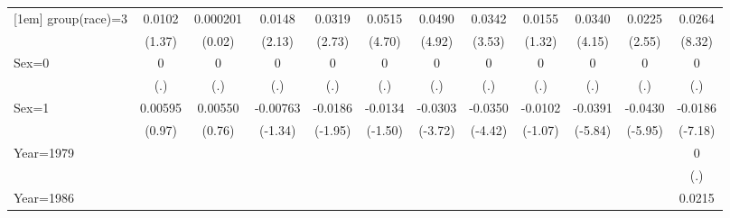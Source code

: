 \begin{table}[htbp]
\begin{tabular}{l*{11}{c}}
[1em]
group(race)=3       &      0.0102         &    0.000201         &      0.0148\sym{*}  &      0.0319\sym{**} &      0.0515\sym{***}&      0.0490\sym{***}&      0.0342\sym{***}&      0.0155         &      0.0340\sym{***}&      0.0225\sym{*}  &      0.0264\sym{***}\\
                    &      (1.37)         &      (0.02)         &      (2.13)         &      (2.73)         &      (4.70)         &      (4.92)         &      (3.53)         &      (1.32)         &      (4.15)         &      (2.55)         &      (8.32)         \\
[1em]
Sex=0               &           0         &           0         &           0         &           0         &           0         &           0         &           0         &           0         &           0         &           0         &           0         \\
                    &         (.)         &         (.)         &         (.)         &         (.)         &         (.)         &         (.)         &         (.)         &         (.)         &         (.)         &         (.)         &         (.)         \\
[1em]
Sex=1               &     0.00595         &     0.00550         &    -0.00763         &     -0.0186         &     -0.0134         &     -0.0303\sym{***}&     -0.0350\sym{***}&     -0.0102         &     -0.0391\sym{***}&     -0.0430\sym{***}&     -0.0186\sym{***}\\
                    &      (0.97)         &      (0.76)         &     (-1.34)         &     (-1.95)         &     (-1.50)         &     (-3.72)         &     (-4.42)         &     (-1.07)         &     (-5.84)         &     (-5.95)         &     (-7.18)         \\
[1em]
Year=1979           &                     &                     &                     &                     &                     &                     &                     &                     &                     &                     &           0         \\
                    &                     &                     &                     &                     &                     &                     &                     &                     &                     &                     &         (.)         \\
[1em]
Year=1986           &                     &                     &                     &                     &                     &                     &                     &                     &                     &                     &      0.0215\sym{***}\\

\end{tabular}
\end{table}
